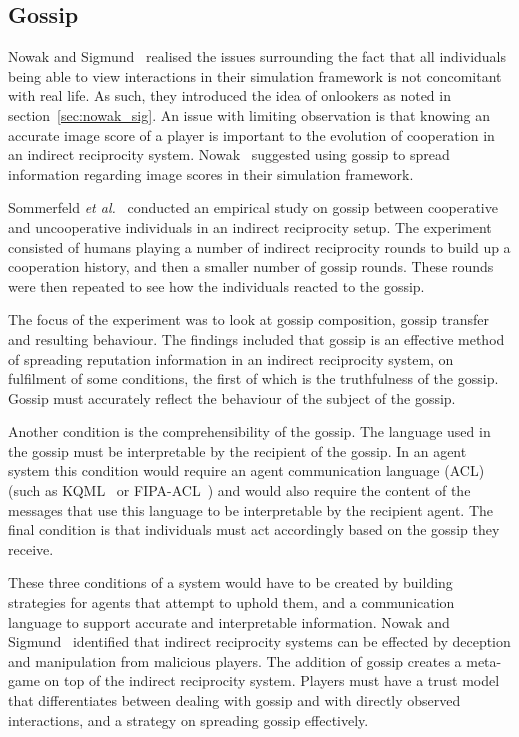 \documentclass[]{final_report}
\begin{document}
\subsection{Gossip}
Nowak and Sigmund~\cite{evol_indirect_image} realised the issues surrounding the fact that all individuals being able to view interactions in their simulation framework is not concomitant with real life. As such, they introduced the idea of onlookers as noted in section~\ref{sec:nowak_sig}. An issue with limiting observation is that knowing an accurate image score of a player is important to the evolution of cooperation in an indirect reciprocity system. Nowak~\cite{five_rules_coop} suggested using gossip to spread information regarding image scores in their simulation framework.\par
Sommerfeld \textit{et al.}~\cite{gossip_alt} conducted an empirical study on gossip between cooperative and uncooperative individuals in an indirect reciprocity setup. The experiment consisted of humans playing a number of indirect reciprocity rounds to build up a cooperation history, and then a smaller number of gossip rounds. These rounds were then repeated to see how the individuals reacted to the gossip.\par
The focus of the experiment was to look at gossip composition, gossip transfer and resulting behaviour. The findings included that gossip is an effective method of spreading reputation information in an indirect reciprocity system, on fulfilment of some conditions, the first of which is the truthfulness of the gossip. Gossip must accurately reflect the behaviour of the subject of the gossip.\par
Another condition is the comprehensibility of the gossip. The language used in the gossip must be interpretable by the recipient of the gossip. In an agent system this condition would require an agent communication language (ACL) (such as KQML~\cite{finin1994kqml} or FIPA-ACL~\cite{o1998fipa}) and would also require the content of the messages that use this language to be interpretable by the recipient agent. The final condition is that individuals must act accordingly based on the gossip they receive.\par
These three conditions of a system would have to be created by building strategies for agents that attempt to uphold them, and a communication language to support accurate and interpretable information. Nowak and Sigmund~\cite{evol_indirect_image} identified that indirect reciprocity systems can be effected by deception and manipulation from malicious players. The addition of gossip creates a meta-game on top of the indirect reciprocity system. Players must have a trust model that differentiates between dealing with gossip and with directly observed interactions, and a strategy on spreading gossip effectively.
\end{document}
